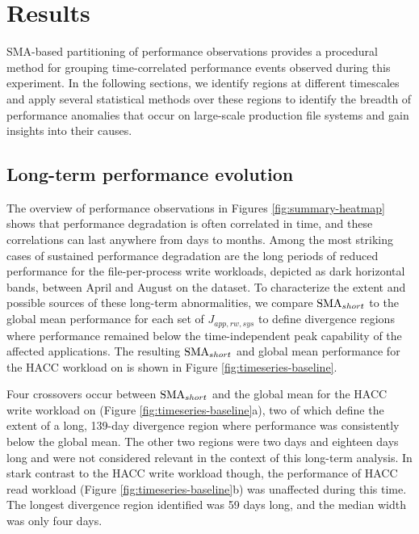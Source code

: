 \section{Results}\label{sec:results}

SMA-based partitioning of performance observations provides a procedural method for grouping time-correlated performance events observed during this experiment.
In the following sections, we identify regions at different timescales and apply several statistical methods over these regions to identify the breadth of performance anomalies that occur on large-scale production file systems and gain insights into their causes.


\subsection{Long-term performance evolution} \label{sec:results/longterm}

The overview of performance observations in Figures \ref{fig:summary-heatmap} shows that performance degradation is often correlated in time, and these correlations can last anywhere from days to months.
Among the most striking cases of sustained performance degradation are the long periods of reduced performance for the file-per-process write workloads, depicted as dark horizontal bands, between April and August on the \cori dataset.
To characterize the extent and possible sources of these long-term abnormalities, we compare $\textup{SMA}_{short}$ to the global mean performance for each set of $J_{app, rw, sys}$ to define divergence regions where performance remained below the time-independent peak capability of the affected applications.
The resulting $\textup{SMA}_{short}$ and global mean performance for the HACC workload on \cori is shown in Figure \ref{fig:timeseries-baseline}.

Four crossovers occur between $\textup{SMA}_{short}$ and the global mean for the HACC write workload on \cori (Figure \ref{fig:timeseries-baseline}a), two of which define the extent of a long, 139-day divergence region where performance was consistently below the global mean.
The other two regions were two days and eighteen days long and were not considered relevant in the context of this long-term analysis.
In stark contrast to the HACC write workload though, the performance of HACC read workload (Figure \ref{fig:timeseries-baseline}b) was unaffected during this time.
The longest divergence region identified was 59 days long, and the median width was only four days.

